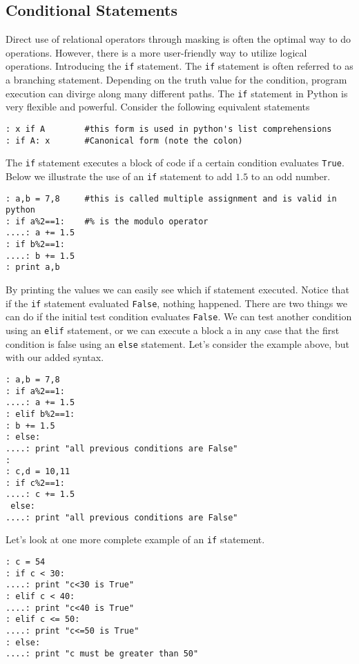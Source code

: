 

\subsection*{Conditional Statements}
Direct use of relational operators through masking is often the optimal way to do operations. However, there is a more user-friendly way to utilize logical operations.  Introducing the {\tt if} statement.  The {\tt if} statement is often referred to as a branching statement.  Depending on the truth value for the condition, program execution can divirge along many different paths.  The {\tt if} statement in Python is very flexible and powerful.  Consider the following equivalent statements
\begin{lstlisting}
: x if A        #this form is used in python's list comprehensions
: if A: x       #Canonical form (note the colon)
\end{lstlisting}

The {\tt if} statement executes a block of code if a certain condition evaluates {\tt True}.  Below we illustrate the use of an {\tt if} statement to add $1.5$ to an odd number.
\begin{lstlisting}
: a,b = 7,8     #this is called multiple assignment and is valid in python
: if a%2==1:    #% is the modulo operator
....: a += 1.5
: if b%2==1:
....: b += 1.5
: print a,b
\end{lstlisting}

By printing the values we can easily see which if statement executed.  Notice that if the {\tt if} statement evaluated {\tt False}, nothing happened.  There are two things we can do if the initial test condition evaluates {\tt False}.  We can test another condition using an {\tt elif} statement, or we can execute a block a in any case that the first condition is false using an {\tt else} statement.  Let's consider the example above, but with our added syntax.
\begin{lstlisting}
: a,b = 7,8
: if a%2==1:
....: a += 1.5
: elif b%2==1:
: b += 1.5
: else:
....: print "all previous conditions are False"
:
: c,d = 10,11
: if c%2==1:
....: c += 1.5
 else:
....: print "all previous conditions are False"
\end{lstlisting}

Let's look at one more complete example of an {\tt if} statement.  
\begin{lstlisting}
: c = 54
: if c < 30:
....: print "c<30 is True"
: elif c < 40:
....: print "c<40 is True"
: elif c <= 50:
....: print "c<=50 is True"
: else:
....: print "c must be greater than 50"
\end{lstlisting}

